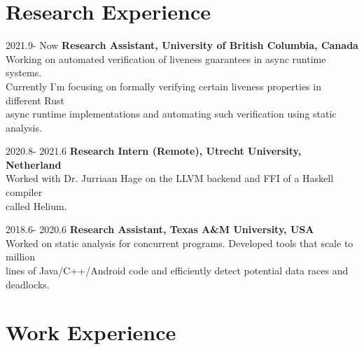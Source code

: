 \documentclass[12pt,letterpaper]{report}
\begin{document}

\section*{Research Experience}
\begin{tablist}[style=multiline, leftmargin=*]
	\item[2021.9- Now]
	\tab \textbf{Research Assistant, University of British Columbia, Canada}\\
	\tab Working on automated verification of liveness guarantees in async runtime systems. \\
	\tab Currently I'm focusing on formally verifying certain liveness properties in different Rust \\
	\tab async runtime implementations and automating such verification using static analysis.\\
	\item[2020.8- 2021.6]
	\tab \textbf{Research Intern (Remote), Utrecht University, Netherland}\\
	\tab Worked with Dr. Jurriaan Hage on the LLVM backend and FFI of a Haskell compiler \\
	\tab called Helium.
	\item[2018.6- 2020.6]
	\tab \textbf{Research Assistant, Texas A\&M University, USA}\\
	\tab Worked on static analysis for concurrent programs. Developed tools that scale to million\\
	\tab lines of Java/C++/Android code and efficiently detect potential data races and deadlocks.
\end{tablist}


\section*{Work Experience}
\end{document}
